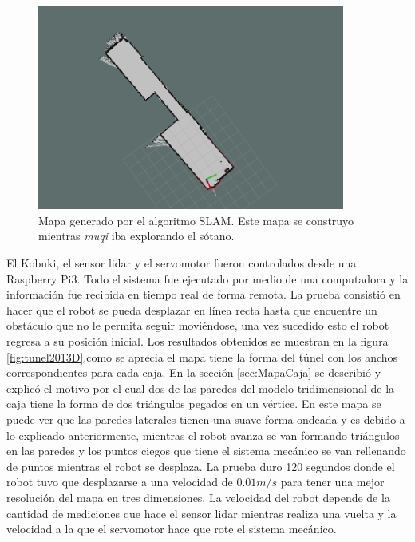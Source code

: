 \begin{figure}
  \centering \footnotesize
  \includegraphics[width=0.90\textwidth]{images/2DSotanoSLAM.png}
  \captionsetup{font=footnotesize}
  \caption{Mapa generado por el algoritmo SLAM. Este mapa se construyo mientras
  \textit{muqi} iba explorando el sótano.}
  \label{fig:slamSotano}
\end{figure}

El Kobuki, el sensor lidar y el servomotor fueron controlados desde una Raspberry Pi3. Todo 
el sistema fue ejecutado por medio de una computadora y la información fue recibida en tiempo 
real de forma remota. La prueba consistió en hacer que el robot se pueda desplazar en línea 
recta hasta que encuentre un obstáculo que no le permita seguir moviéndose, una vez sucedido 
esto el robot regresa a su posición inicial. Los resultados obtenidos se muestran en la figura
\ref{fig:tunel2013D},como se aprecia el mapa tiene la forma del túnel con los anchos correspondientes 
para cada caja. En la sección \ref{sec:MapaCaja} se describió y explicó el motivo por el cual dos 
de las paredes del modelo tridimensional de la caja tiene la forma de dos triángulos pegados en 
un vértice. En este mapa se puede ver que las paredes laterales tienen una suave forma ondeada 
y es debido a lo explicado anteriormente, mientras el robot avanza se van formando triángulos 
en las paredes y los puntos ciegos que tiene el sistema mecánico se van rellenando de puntos 
mientras el robot se desplaza. La prueba duro 120 segundos donde el robot tuvo que desplazarse 
a una velocidad de $0.01 m/s$ para tener una mejor resolución del mapa en tres dimensiones. La 
velocidad del robot depende de la cantidad de mediciones que hace el sensor lidar mientras 
realiza una vuelta y la velocidad a la que el servomotor hace que rote el sistema mecánico.

